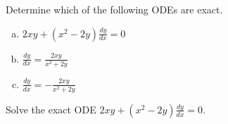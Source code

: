 \begin{applicationActivities}
\begin{activity}{10}
Determine which of the following ODEs are exact.
\begin{enumerate}[(a)]
\item \(2xy+(x^2-2y)\frac{dy}{dx}=0\) 
\item \(\frac{dy}{dx} = \frac{2xy}{x^2+2y} \)
\item \(\frac{dy}{dx} = -\frac{2xy}{x^2+2y} \)
\end{enumerate}
\end{activity}

\begin{activity}{10}
Solve the exact ODE \(2xy+(x^2-2y) \frac{dy}{dx}=0\).
\end{activity}


\end{applicationActivities}
